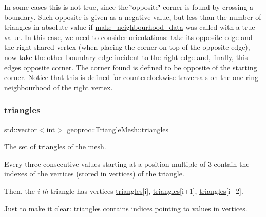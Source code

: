 In some cases this is not true, since the \char`\"{}opposite\char`\"{} corner is found by crossing a boundary. Such opposite is given as a negative value, but less than the number of triangles in absolute value if \hyperlink{classgeoproc_1_1TriangleMesh_a84003dfdfd5e591c00f01a797578ff1f}{make\+\_\+neighbourhood\+\_\+data} was called with a \textquotesingle{}true\textquotesingle{} value. In this case, we need to consider orientations\+: take its opposite edge and the \textquotesingle{}right\textquotesingle{} shared vertex (when placing the corner \textquotesingle{}on top of\textquotesingle{} the opposite edge), now take the other boundary edge incident to the \textquotesingle{}right\textquotesingle{} edge and, finally, this edge\textquotesingle{}s opposite corner. The corner found is defined to be opposite of the starting corner. Notice that this is defined for counterclockwise traversals on the one-\/ring neighbourhood of the \textquotesingle{}right\textquotesingle{} vertex. \mbox{\label{classgeoproc_1_1TriangleMesh_ad1cf20622f2bb080100862f413bd89c2}} 
\subsubsection{\texorpdfstring{triangles}{triangles}}
{\footnotesize\ttfamily std\+::vector$<$int$>$ geoproc\+::\+Triangle\+Mesh\+::triangles\hspace{0.3cm}{\ttfamily [protected]}}



The set of triangles of the mesh. 

Every three consecutive values starting at a position multiple of 3 contain the indexes of the vertices (stored in \hyperlink{classgeoproc_1_1TriangleMesh_a82c3351de37daa9440f53597f080992d}{vertices}) of the triangle.

Then, the {\itshape i-\/th} triangle has vertices \hyperlink{classgeoproc_1_1TriangleMesh_ad1cf20622f2bb080100862f413bd89c2}{triangles}\mbox{[}i\mbox{]}, \hyperlink{classgeoproc_1_1TriangleMesh_ad1cf20622f2bb080100862f413bd89c2}{triangles}\mbox{[}i+1\mbox{]}, \hyperlink{classgeoproc_1_1TriangleMesh_ad1cf20622f2bb080100862f413bd89c2}{triangles}\mbox{[}i+2\mbox{]}.

Just to make it clear\+: \hyperlink{classgeoproc_1_1TriangleMesh_ad1cf20622f2bb080100862f413bd89c2}{triangles} contains indices pointing to values in \hyperlink{classgeoproc_1_1TriangleMesh_a82c3351de37daa9440f53597f080992d}{vertices}. \mbox{\label{classgeoproc_1_1TriangleMesh_abbc25699f67776fc99c909124b0c584a}} 

